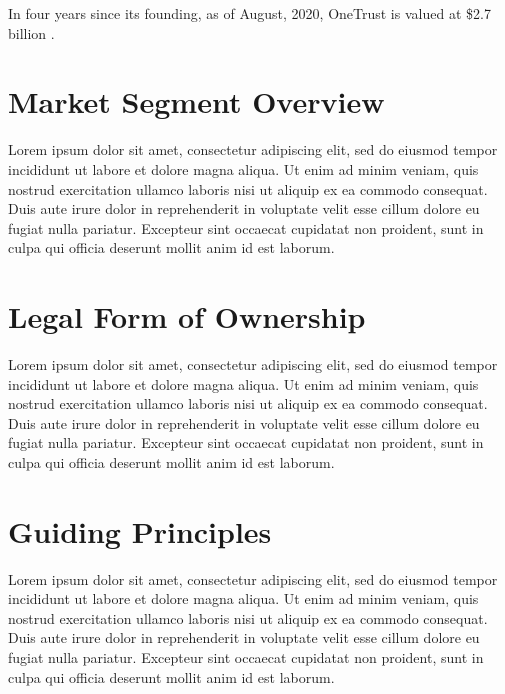 In four years since its founding, as of August, 2020, OneTrust is valued at \$2.7 billion \cite{hughes.iapp.2020}.

\section{Market Segment Overview}

Lorem ipsum dolor sit amet, consectetur adipiscing elit, sed do eiusmod tempor incididunt ut labore et dolore magna aliqua. Ut enim ad minim veniam, quis nostrud exercitation ullamco laboris nisi ut aliquip ex ea commodo consequat. Duis aute irure dolor in reprehenderit in voluptate velit esse cillum dolore eu fugiat nulla pariatur. Excepteur sint occaecat cupidatat non proident, sunt in culpa qui officia deserunt mollit anim id est laborum.


\section{Legal Form of Ownership}

Lorem ipsum dolor sit amet, consectetur adipiscing elit, sed do eiusmod tempor incididunt ut labore et dolore magna aliqua. Ut enim ad minim veniam, quis nostrud exercitation ullamco laboris nisi ut aliquip ex ea commodo consequat. Duis aute irure dolor in reprehenderit in voluptate velit esse cillum dolore eu fugiat nulla pariatur. Excepteur sint occaecat cupidatat non proident, sunt in culpa qui officia deserunt mollit anim id est laborum.


\section{Guiding Principles}

Lorem ipsum dolor sit amet, consectetur adipiscing elit, sed do eiusmod tempor incididunt ut labore et dolore magna aliqua. Ut enim ad minim veniam, quis nostrud exercitation ullamco laboris nisi ut aliquip ex ea commodo consequat. Duis aute irure dolor in reprehenderit in voluptate velit esse cillum dolore eu fugiat nulla pariatur. Excepteur sint occaecat cupidatat non proident, sunt in culpa qui officia deserunt mollit anim id est laborum.
